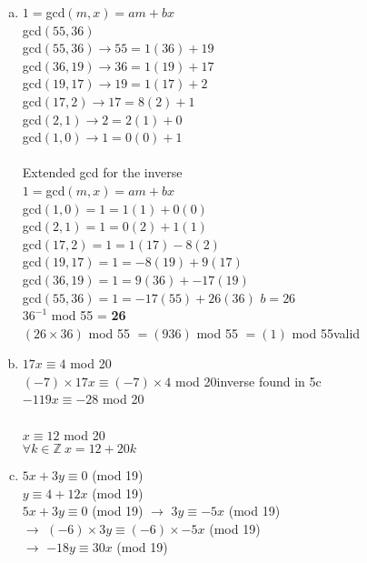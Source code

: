 \documentclass[11pt,letterpaper]{article}
\begin{document}
\begin{enumerate}[(a)]
$= 8\times3^{-1}$ mod 20\\
$= 8\times7$ mod 20\hfill inverse found in 5c\\
$= 56$ mod 20\\
$= 16$ mod 20\\
\item
$1=$gcd$(m,x)=am+bx$\\
gcd$(55,36)$\\
gcd$(55,36)\rightarrow55 = 1(36) + 19$\\
gcd$(36,19)\rightarrow36 = 1(19)+ 17$\\
gcd$(19,17)\rightarrow19 = 1(17)+ 2$\\
gcd$(17,2)\rightarrow17 = 8(2)+ 1$\\
gcd$(2,1)\rightarrow2 = 2(1)+ 0$\\
gcd$(1,0)\rightarrow1 = 0(0)+ 1$\\
\\
Extended gcd for the inverse\\
$1=$gcd$(m,x)=am+bx$\\
gcd$(1,0)=1= 1(1)+ 0(0)$\\
gcd$(2,1)=1 = 0(2)+ 1(1)$\\
gcd$(17,2)=1 = 1(17)- 8(2)$\\
gcd$(19,17)=1 = -8(19) + 9(17)$\\
gcd$(36,19)=1 = 9(36) + -17(19)$\\
gcd$(55,36)=1 = -17(55) + 26(36)$  $b=26$\\
$36^{-1}$ mod 55 = \textbf{26}\\
$(26\times36)$ mod 55 $=(936)$ mod 55 $=(1)$ mod 55\hfill valid\\
\item
$17x\equiv4$ mod 20\\
$(-7)\times17x\equiv(-7)\times4$ mod 20\hfill inverse found in 5c\\
$-119x\equiv-28$ mod 20\\
\\
$x\equiv12$ mod 20\\
$\forall k\in\mathbb{Z}~x=12+20k$\\
\clearpage
\item
$5x+3y\equiv0$ (mod 19)\\
$y\equiv4+12x$ (mod 19)\\
$5x+3y\equiv0$ (mod 19) $\rightarrow$ $3y\equiv-5x$ (mod 19)\\ 
$\rightarrow$ $(-6)\times3y\equiv(-6)\times-5x$ (mod 19)\\
$\rightarrow$ $-18y\equiv30x$ (mod 19)\\

\end{enumerate}
\end{document}
